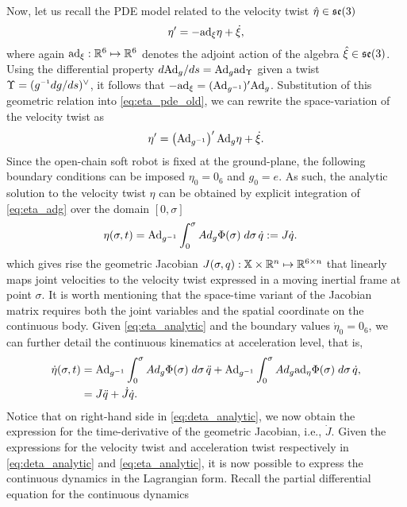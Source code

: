 Now, let us recall the PDE model related to the velocity twist $\hat{\eta} \in {\mathfrak{se}(3)}$ 
%
\begin{equation}
\eta' = - \text{ad}_{\xi} \eta + \dot{\xi}, \label{eq:eta_pde_old}
\end{equation}
%
where again $\text{ad}_{\xi}: \mathbb{R}^6 \mapsto \mathbb{R}^6$ denotes the adjoint action of the algebra $\hat{\xi} \in {\mathfrak{se}(3)}$. Using the differential property $d\text{Ad}_g/ds = \text{Ad}_g \text{ad}_{\Upsilon}$ given a twist $\Upsilon = (g\inv dg/ds)^\vee$, it follows that $-\text{ad}_{\xi} = (\text{Ad}_{g^{-1}})' \text{Ad}_{g}$. Substitution of this geometric relation into \eqref{eq:eta_pde_old}, we can rewrite the space-variation of the velocity twist as
%
\begin{equation}
\eta' = \left(\text{Ad}_{g^{-1}}\right) ' \text{Ad}_{g} \eta + \dot{\xi}. \label{eq:eta_adg}
\end{equation}
%
Since the open-chain soft robot is fixed at the ground-plane, the following boundary conditions can be imposed $\eta_0 = 0_6$ and $g_0 = e$. As such, the analytic solution to the velocity twist $\eta$ can be obtained by explicit integration of \eqref{eq:eta_adg}  over the domain $[0,\sigma]$
%
\begin{align}
\eta(\sigma,t) & = \text{Ad}_{g^{-1}} \int_0^\sigma Ad_{g} \Phi(\sigma) \; d\sigma\, \dot{q} := J\dot{q}. \label{eq:eta_analytic}
\end{align}
%
which gives rise the geometric Jacobian $J(\sigma,q): \mathbb{X} \times \mathbb{R}^n  \mapsto \mathbb{R}^{6\times n}$ that linearly maps joint velocities to the velocity twist expressed in a moving inertial frame at point $\sigma$. It is worth mentioning that the space-time variant of the Jacobian matrix requires both the joint variables and the spatial coordinate on the continuous body. Given \eqref{eq:eta_analytic} and the boundary values $\dot{\eta}_0 = 0_6$, we can further detail the continuous kinematics at acceleration level, that is,
%
\begin{align}
\dot{\eta}(\sigma,t) & = \text{Ad}_{g^{-1}} \int_{0}^\sigma Ad_{g} \Phi(\sigma) \; d\sigma\, \ddot{q} + \text{Ad}_{g^{-1}} \int_{0}^\sigma Ad_{g} \text{ad}_{\eta} \Phi(\sigma) \; d\sigma\, \dot{q}, \notag \\ & = J\ddot{q} + \dot{J}\dot{q}.\label{eq:deta_analytic}
\end{align}
%
Notice that on right-hand side in \eqref{eq:deta_analytic}, we now obtain the expression for the time-derivative of the geometric Jacobian, i.e., $\dot{J}$. Given the expressions for the velocity twist and acceleration twist respectively in \eqref{eq:deta_analytic} and \eqref{eq:eta_analytic}, it is now possible to express the continuous dynamics in the Lagrangian form. Recall the partial differential equation for the continuous dynamics 
